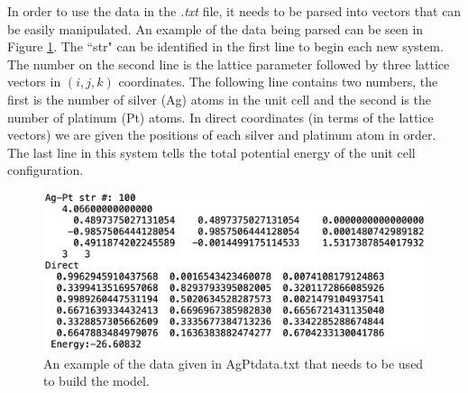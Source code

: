 \par In order to use the data in the \textit{.txt} file, it needs to be parsed into vectors that can be easily manipulated. An example of the data being parsed can be seen in Figure \ref{system2data}. The ``str" can be identified in the first line to begin each new system. The number on the second line is the lattice parameter followed by three lattice vectors in $(i,j,k)$ coordinates. The following line contains two numbers, the first is the number of silver (Ag) atoms in the unit cell and the second is the number of platinum (Pt) atoms. In direct coordinates (in terms of the lattice vectors) we are given the positions of each silver and platinum atom in order. The last line in this system tells the total potential energy of the unit cell configuration. 

\begin{figure}[h]
\includegraphics[scale = 0.3]{Figures/system2}
\caption{An example of the data given in AgPtdata.txt that needs to be used to build the model.
\label{system2data}} 
\end{figure}

